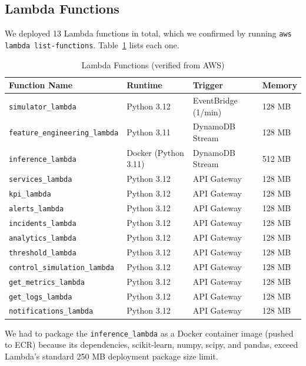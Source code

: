 \documentclass[11pt,a4paper]{article}
\begin{document}
\subsection{Lambda Functions}

We deployed 13 Lambda functions in total, which we confirmed by running \texttt{aws lambda list-functions}. Table~\ref{tab:lambda-functions} lists each one.

\begin{table}[H]
\centering
\begin{tabular}{llll}
\toprule
\textbf{Function Name} & \textbf{Runtime} & \textbf{Trigger} & \textbf{Memory} \\
\midrule
\texttt{simulator\_lambda} & Python 3.12 & EventBridge (1/min) & 128 MB \\
\texttt{feature\_engineering\_lambda} & Python 3.11 & DynamoDB Stream & 128 MB \\
\texttt{inference\_lambda} & Docker (Python 3.11) & DynamoDB Stream & 512 MB \\
\texttt{services\_lambda} & Python 3.12 & API Gateway & 128 MB \\
\texttt{kpi\_lambda} & Python 3.12 & API Gateway & 128 MB \\
\texttt{alerts\_lambda} & Python 3.12 & API Gateway & 128 MB \\
\texttt{incidents\_lambda} & Python 3.12 & API Gateway & 128 MB \\
\texttt{analytics\_lambda} & Python 3.12 & API Gateway & 128 MB \\
\texttt{threshold\_lambda} & Python 3.12 & API Gateway & 128 MB \\
\texttt{control\_simulation\_lambda} & Python 3.12 & API Gateway & 128 MB \\
\texttt{get\_metrics\_lambda} & Python 3.12 & API Gateway & 128 MB \\
\texttt{get\_logs\_lambda} & Python 3.12 & API Gateway & 128 MB \\
\texttt{notifications\_lambda} & Python 3.12 & API Gateway & 128 MB \\
\bottomrule
\end{tabular}
\caption{Lambda Functions (verified from AWS)}
\label{tab:lambda-functions}
\end{table}

We had to package the \texttt{inference\_lambda} as a Docker container image (pushed to ECR) because its dependencies, scikit-learn, numpy, scipy, and pandas, exceed Lambda's standard 250 MB deployment package size limit.
\end{document}
